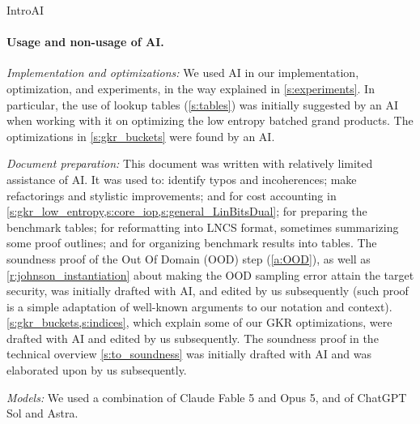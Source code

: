 \begin{lncsmove}{IntroAI}
\iflncs\else

\fi


\paragraph{Usage and non-usage of AI.} 




\emph{Implementation and optimizations:} We  used AI in our implementation, optimization, and experiments, in the way explained in \cref{s:experiments}. In particular, the use of lookup tables (\cref{s:tables}) was initially suggested by an AI when working with it on optimizing the  low entropy batched grand products. The optimizations in \cref{s:gkr_buckets} were found by an AI.

\bigskip

\noindent \emph{Document preparation:} This document was  written with relatively limited assistance of AI. It was  used to:  identify typos and incoherences; make refactorings and stylistic improvements; \iflncs\else and \fi for  cost accounting in \cref{s:gkr_low_entropy,s:core_iop,s:general_LinBitsDual}\iflncs; for preparing the benchmark tables; for reformatting into LNCS format, sometimes summarizing some proof outlines; and for organizing benchmark results into tables\else\fi. The soundness proof of the Out Of Domain (OOD) step (\cref{a:OOD}), as well as \cref{r:johnson_instantiation} about making the OOD sampling error attain the target security, was initially drafted with AI, and edited by us subsequently (such proof is a simple adaptation of well-known arguments to our notation and context).  \cref{s:gkr_buckets,s:indices}, which explain some of our GKR optimizations, were drafted  with AI and edited by us subsequently. \iflncs\else The soundness proof   in the technical overview  \cref{s:to_soundness}  was initially drafted with AI and was elaborated upon by us subsequently. \fi


\iflncs
\bigskip

\noindent \emph{Models:} We used a combination of Claude Fable 5 and Opus 5, and of ChatGPT Sol and Astra.
\else\fi

\end{lncsmove}

